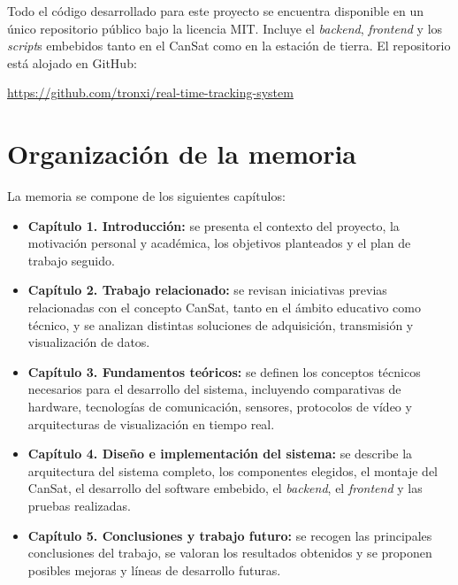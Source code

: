 Todo el código desarrollado para este proyecto se encuentra disponible en un único repositorio público bajo la licencia MIT.
%
Incluye el \emph{backend}, \emph{frontend} y los \emph{script}s embebidos tanto en el CanSat como en la estación de tierra.
%
El repositorio está alojado en GitHub:

\url{https://github.com/tronxi/real-time-tracking-system}


\section{Organización de la memoria}

La memoria se compone de los siguientes capítulos:

\begin{itemize}
    \item \textbf{Capítulo 1. Introducción:} se presenta el contexto del proyecto, la motivación personal y académica, los objetivos planteados y el plan de trabajo seguido.

    \item \textbf{Capítulo 2. Trabajo relacionado:} se revisan iniciativas previas relacionadas con el concepto CanSat, tanto en el ámbito educativo como técnico, y se analizan distintas soluciones de adquisición, transmisión y visualización de datos.

    \item \textbf{Capítulo 3. Fundamentos teóricos:} se definen los conceptos técnicos necesarios para el desarrollo del sistema, incluyendo comparativas de hardware, tecnologías de comunicación, sensores, protocolos de vídeo y arquitecturas de visualización en tiempo real.

    \item \textbf{Capítulo 4. Diseño e implementación del sistema:} se describe la arquitectura del sistema completo, los componentes elegidos, el montaje del CanSat, el desarrollo del software embebido, el \emph{backend}, el \emph{frontend} y las pruebas realizadas.

    \item \textbf{Capítulo 5. Conclusiones y trabajo futuro:} se recogen las principales conclusiones del trabajo, se valoran los resultados obtenidos y se proponen posibles mejoras y líneas de desarrollo futuras.
\end{itemize}